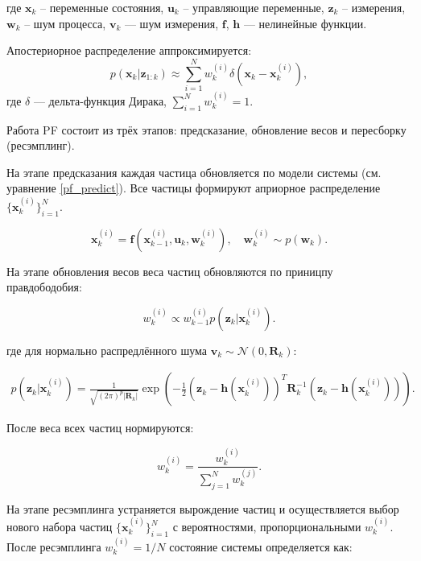 где \(\mathbf{x}_k\) -- переменные состояния, \(\mathbf{u}_k\) -- управляющие переменные,
\(\mathbf{z}_k\) -- измерения,
\(\mathbf{w}_k\) -- шум процесса,
\(\mathbf{v}_k\) — шум измерения,
\(\mathbf{f}\), \(\mathbf{h}\) — нелинейные функции. 

Апостериорное распределение аппроксимируется:
\begin{equation}
    p(\mathbf{x}_k | \mathbf{z}_{1:k}) \approx \sum_{i=1}^N w_k^{(i)} \delta(\mathbf{x}_k - \mathbf{x}_k^{(i)}),
\end{equation}
где \(\delta\) — дельта-функция Дирака, \(\sum_{i=1}^N w_k^{(i)} = 1\).


Работа PF состоит из трёх этапов: предсказание, обновление весов и пересборку (ресэмплинг).

На этапе предсказания каждая частица обновляется по модели системы (см. уравнение \ref{pf_predict}).
Все частицы формируют априорное распределение \(\{\mathbf{x}_k^{(i)}\}_{i=1}^N\).

\begin{equation}
	\mathbf{x}_k^{(i)} = \mathbf{f}(\mathbf{x}_{k-1}^{(i)}, \mathbf{u}_k, \mathbf{w}_k^{(i)}), \quad \mathbf{w}_k^{(i)} \sim p(\mathbf{w}_k). \label{pf_predict}
\end{equation}


На этапе обновления весов веса частиц обновляются по приницпу правдободобия:

\begin{equation}
	w_k^{(i)} \propto w_{k-1}^{(i)} p(\mathbf{z}_k | \mathbf{x}_k^{(i)}).
\end{equation}

где для нормально распредлённого шума \(\mathbf{v}_k \sim \mathcal{N}(0, \mathbf{R}_k)\):

\begin{align}
    p(\mathbf{z}_k | \mathbf{x}_k^{(i)}) = \frac{1}{\sqrt{(2\pi)^p |\mathbf{R}_k|}} \exp\left(-\frac{1}{2} (\mathbf{z}_k - \mathbf{h}(\mathbf{x}_k^{(i)}))^T \mathbf{R}_k^{-1} (\mathbf{z}_k - \mathbf{h}(\mathbf{x}_k^{(i)}))\right).
\end{align}

После веса всех частиц нормируются:

\begin{equation}
    w_k^{(i)} = \frac{w_k^{(i)}}{\sum_{j=1}^N w_k^{(j)}}.
\end{equation}

На этапе ресэмплинга устраняется вырождение частиц
и осуществляется выбор нового набора частиц \(\{\mathbf{x}_k^{(i)}\}_{i=1}^N\) с вероятностями,
пропорциональными \(w_k^{(i)}\). После ресэмплинга \(w_k^{(i)} = 1/N\) состояние системы 
определяется как:

